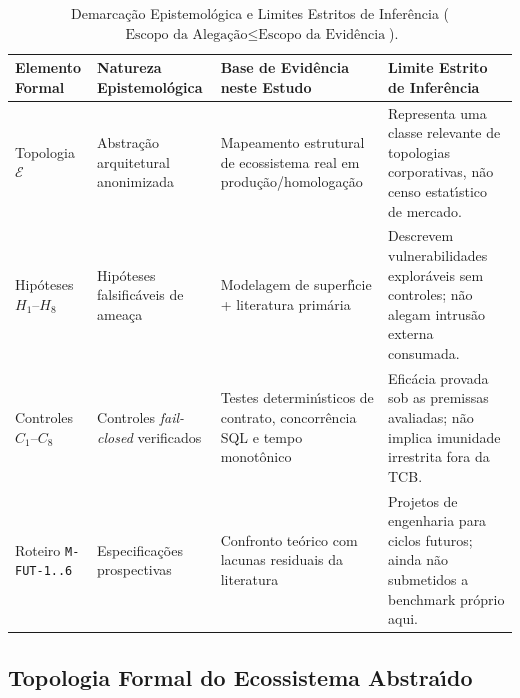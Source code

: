 \documentclass[10pt,twocolumn]{article}
\begin{document}
\begin{table}[t]
\centering
\caption{Demarca\c{c}\~{a}o Epistemol\'{o}gica e Limites Estritos de Infer\^{e}ncia ($\text{Escopo da Alega\c{c}\~{a}o} \le \text{Escopo da Evid\^{e}ncia}$).}
\label{tab:epistemic_pt}
\footnotesize
\begin{tabularx}{\textwidth}{@{}l l Y Y@{}}
\toprule
\textbf{Elemento Formal} & \textbf{Natureza Epistemol\'{o}gica} & \textbf{Base de Evid\^{e}ncia neste Estudo} & \textbf{Limite Estrito de Infer\^{e}ncia} \\
\midrule
Topologia $\mathcal{E}$ & Abstra\c{c}\~{a}o arquitetural anonimizada & Mapeamento estrutural de ecossistema real em produ\c{c}\~{a}o/homologa\c{c}\~{a}o & Representa uma classe relevante de topologias corporativas, n\~{a}o censo estat\'{\i}stico de mercado. \\
\addlinespace[2pt]
Hip\'{o}teses $H_1$--$H_8$ & Hip\'{o}teses falsific\'{a}veis de amea\c{c}a & Modelagem de superf\'{\i}cie + literatura prim\'{a}ria~\cite{R01,R15,R22,R25,R26,R28,R29} & Descrevem vulnerabilidades explor\'{a}veis sem controles; n\~{a}o alegam intrus\~{a}o externa consumada. \\
\addlinespace[2pt]
Controles $C_1$--$C_8$ & Controles \emph{fail-closed} verificados & Testes determin\'{\i}sticos de contrato, concorr\^{e}ncia SQL e tempo monot\^{o}nico & Efic\'{a}cia provada sob as premissas avaliadas; n\~{a}o implica imunidade irrestrita fora da TCB. \\
\addlinespace[2pt]
Roteiro \texttt{M-FUT-1..6} & Especifica\c{c}\~{o}es prospectivas & Confronto te\'{o}rico com lacunas residuais da literatura~\cite{R07,R08,R13,R16,R20,R27} & Projetos de engenharia para ciclos futuros; ainda n\~{a}o submetidos a benchmark pr\'{o}prio aqui. \\
\bottomrule
\end{tabularx}
\end{table}

\subsection{Topologia Formal do Ecossistema Abstra\'{\i}do}
\end{document}
